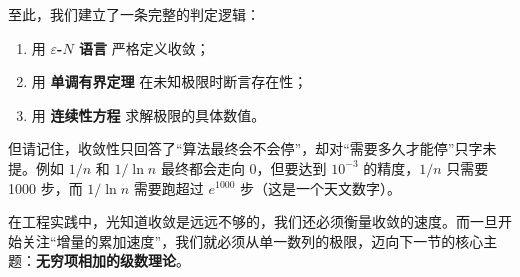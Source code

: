 至此，我们建立了一条完整的判定逻辑：
\begin{enumerate}
  \item 用 \textbf{\(\varepsilon\)-\(N\) 语言} 严格定义收敛；
  \item 用 \textbf{单调有界定理} 在未知极限时断言存在性；
  \item 用 \textbf{连续性方程} 求解极限的具体数值。
\end{enumerate}

但请记住，收敛性只回答了``算法最终会不会停''，却对``需要多久才能停''只字未提。例如 \(1/n\) 和 \(1/\ln n\) 最终都会走向 0，但要达到 \(10^{-3}\) 的精度，\(1/n\) 只需要 1000 步，而 \(1/\ln n\) 需要跑超过 \(e^{1000}\) 步（这是一个天文数字）。

在工程实践中，光知道收敛是远远不够的，我们还必须衡量收敛的速度。而一旦开始关注``增量的累加速度''，我们就必须从单一数列的极限，迈向下一节的核心主题：\textbf{无穷项相加的级数理论}。